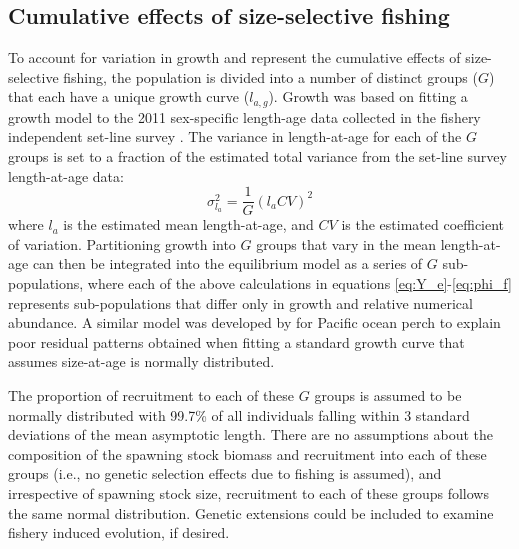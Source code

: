 \documentclass[12pt,leqno]{article}
\begin{document}
\subsection*{Cumulative effects of size-selective fishing} %
\label{sub:cumulative_effects_of_size_selective_fishing}
To account for variation in growth and represent the cumulative effects of size-selective fishing, the population is divided into a number of distinct groups ($G$) that each have a unique growth curve ($l_{a,g}$).  Growth was based on fitting a growth model to the 2011 sex-specific length-age data collected in the fishery independent set-line survey \citep{martell2013:ohr}. The variance in length-at-age for each of the $G$ groups is set to a fraction of the estimated total variance from  the set-line survey length-at-age data:
\[
 \sigma_{l_a}^2 = \frac{1}{G} (l_a CV)^2
\]
where $l_a$ is the estimated mean length-at-age, and $CV$ is the estimated coefficient of variation.  Partitioning growth  into $G$  groups that vary in the mean length-at-age can then be integrated into the equilibrium model as a series of $G$ sub-populations, where each of the above calculations in equations \eqref{eq:Y_e}-\eqref{eq:phi_f} represents sub-populations that differ only in growth and relative numerical abundance. A similar model was developed by \cite{mulligan1992length} for Pacific ocean perch to explain poor residual patterns obtained when fitting a standard growth curve that assumes size-at-age is normally distributed.

The proportion of recruitment to each of these $G$ groups is assumed to be normally distributed with 99.7\% of all individuals falling within 3 standard deviations of the mean asymptotic length.  There are no assumptions about the composition of the spawning stock biomass and recruitment into each of these groups (i.e., no genetic selection effects due to fishing is assumed), and irrespective of spawning stock size, recruitment to each of these groups follows the same normal distribution.  Genetic extensions could be included to examine fishery induced evolution, if desired.
\end{document}
